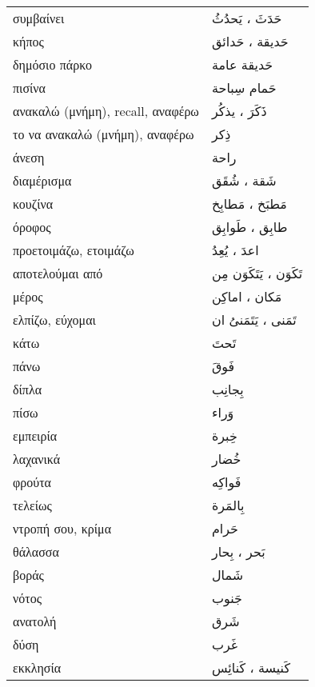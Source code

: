 \documentclass[twocolumn,a4paper]{article}
\newcommand{\ar}[1]{\textarabic{#1}}
\newcommand{\pl}{\raisebox{0.15ex}{\footnotesize ◍}}
\newcommand{\vrf}{\raisebox{0.15ex}{\footnotesize ◉}}
\newcommand{\mas}{\raisebox{0.15ex}{\footnotesize ◫}}
\begin{document}
\begin{mpsupertabular}{ P{0.5\textwidth} P{0.5\textwidth} }
συμβαίνει \vrf               & \ar{ حَدَثَ ، يَحدُثُ } \\
κήπος \pl                    & \ar{ حَديقة ، حَدائق } \\
δημόσιο πάρκο                & \ar{ حَديقة عامة } \\
πισίνα                       & \ar{ حَمام سِباحة } \\
ανακαλώ (μνήμη), recall, αναφέρω \vrf  & \ar{ ذَكَرَ ، يذكُر } \\
το να ανακαλώ (μνήμη), αναφέρω \mas    & \ar{ ذِكر } \\
άνεση                        & \ar{ راحة } \\
διαμέρισμα \pl               & \ar{ شَقة ، شُقَق} \\
κουζίνα \pl                  & \ar{ مَطبَخ ، مَطابِخ } \\
όροφος \pl                   & \ar{ طابِق ، طَوابِق } \\
προετοιμάζω, ετοιμάζω \vrf   & \ar{ اعدَ ، يُعِدُ } \\
αποτελούμαι από \vrf         & \ar{ تَكَوَن ، يَتَكَوَن مِن } \\
μέρος \pl                    & \ar{ مَكان ، اماكِن } \\
ελπίζω, εύχομαι \vrf         & \ar{ تَمَنى ، يَتَمَنىُ ان } \\
κάτω                         & \ar{ تَحتَ } \\
πάνω                         & \ar{ فَوقَ } \\
δίπλα                        & \ar{ بِجانِب } \\
πίσω                         & \ar{ وَراء } \\
εμπειρία                     & \ar{ خِبرة } \\
λαχανικά                     & \ar{ خُضار } \\
φρούτα                       & \ar{ فَواكِه } \\
τελείως                      & \ar{ بِالمَرة } \\
ντροπή σου, κρίμα            & \ar{ حَرام } \\
θάλασσα \pl                  & \ar{ بَحر ، بِحار } \\
βοράς                        & \ar{ شَمال } \\
νότος                        & \ar{ جَنوب } \\
ανατολή                      & \ar{ شَرق } \\
δύση                         & \ar{ غَرب } \\
εκκλησία \pl                 & \ar{ كَنيسة ، كَنائِس } \\

\end{mpsupertabular}
\end{document}
